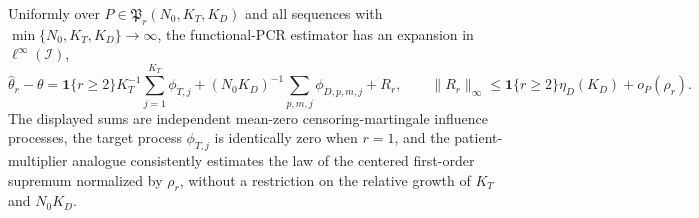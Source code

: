 Uniformly over \(P\in\mathfrak P_r(N_0,K_T,K_D)\) and all sequences with \(\min\{N_0,K_T,K_D\}\to\infty\), the functional-PCR estimator has an expansion in \(\ell^\infty(\mathcal I)\),
\[
 \widehat\theta_r-\theta
 =\mathbf 1\{r\ge2\}K_T^{-1}\sum_{j=1}^{K_T}\phi_{T,j}
 +(N_0K_D)^{-1}\sum_{p,m,j}\phi_{D,p,m,j}+R_r,
 \qquad
 \|R_r\|_\infty\le\mathbf 1\{r\ge2\}\eta_D(K_D)+o_P(\rho_r).
\]
The displayed sums are independent mean-zero censoring-martingale influence processes, the target process \(\phi_{T,j}\) is identically zero when \(r=1\), and the patient-multiplier analogue consistently estimates the law of the centered first-order supremum normalized by \(\rho_r\), without a restriction on the relative growth of \(K_T\) and \(N_0K_D\).